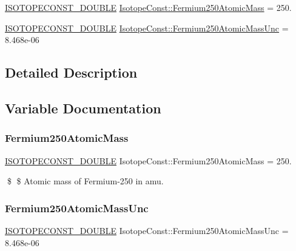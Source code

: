 \begin{DoxyCompactItemize}
\item 
\mbox{\hyperlink{group___isotope_const-_macros_ga8f45a7272ce02c0b4c65c44636ed719a}{I\+S\+O\+T\+O\+P\+E\+C\+O\+N\+S\+T\+\_\+\+D\+O\+U\+B\+LE}} \mbox{\hyperlink{group___isotope_const-_fermium-_fm250_ga5228afd188984c0b043f837a6d5d9593}{Isotope\+Const\+::\+Fermium250\+Atomic\+Mass}} = 250.
\item 
\mbox{\hyperlink{group___isotope_const-_macros_ga8f45a7272ce02c0b4c65c44636ed719a}{I\+S\+O\+T\+O\+P\+E\+C\+O\+N\+S\+T\+\_\+\+D\+O\+U\+B\+LE}} \mbox{\hyperlink{group___isotope_const-_fermium-_fm250_ga2e47891ee1fba4ac0c1530ccec29839b}{Isotope\+Const\+::\+Fermium250\+Atomic\+Mass\+Unc}} = 8.\+468e-\/06
\end{DoxyCompactItemize}


\subsection{Detailed Description}


\subsection{Variable Documentation}
\mbox{\label{group___isotope_const-_fermium-_fm250_ga5228afd188984c0b043f837a6d5d9593}} 
\subsubsection{\texorpdfstring{Fermium250\+Atomic\+Mass}{Fermium250AtomicMass}}
{\footnotesize\ttfamily \mbox{\hyperlink{group___isotope_const-_macros_ga8f45a7272ce02c0b4c65c44636ed719a}{I\+S\+O\+T\+O\+P\+E\+C\+O\+N\+S\+T\+\_\+\+D\+O\+U\+B\+LE}} Isotope\+Const\+::\+Fermium250\+Atomic\+Mass = 250.}

\$ \$ Atomic mass of Fermium-\/250 in amu. \mbox{\label{group___isotope_const-_fermium-_fm250_ga2e47891ee1fba4ac0c1530ccec29839b}} 
\subsubsection{\texorpdfstring{Fermium250\+Atomic\+Mass\+Unc}{Fermium250AtomicMassUnc}}
{\footnotesize\ttfamily \mbox{\hyperlink{group___isotope_const-_macros_ga8f45a7272ce02c0b4c65c44636ed719a}{I\+S\+O\+T\+O\+P\+E\+C\+O\+N\+S\+T\+\_\+\+D\+O\+U\+B\+LE}} Isotope\+Const\+::\+Fermium250\+Atomic\+Mass\+Unc = 8.\+468e-\/06}

